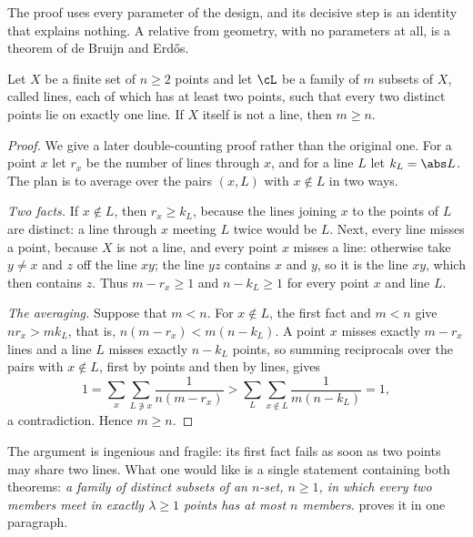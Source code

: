 \begin{refsection}
The proof uses every parameter of the design, and its decisive step is an identity that explains nothing. A relative from geometry, with no parameters at all, is a theorem of de Bruijn and Erd\H{o}s.

\begin{theorem}\label{thm:dimension:dbe}
Let $X$ be a finite set of $n\ge2$ points and let $\cL$ be a family of $m$ subsets of $X$, called lines, each of which has at least two points, such that every two distinct points lie on exactly one line. If $X$ itself is not a line, then $m\ge n$.
\end{theorem}

\begin{proof}
We give a later double-counting proof rather than the original one. For a point $x$ let $r_x$ be the number of lines through $x$, and for a line $L$ let $k_L=\abs L$. The plan is to average over the pairs $(x,L)$ with $x\notin L$ in two ways.

\emph{Two facts.} If $x\notin L$, then $r_x\ge k_L$, because the lines joining $x$ to the points of $L$ are distinct: a line through $x$ meeting $L$ twice would be $L$. Next, every line misses a point, because $X$ is not a line, and every point $x$ misses a line: otherwise take $y\ne x$ and $z$ off the line $xy$; the line $yz$ contains $x$ and $y$, so it is the line $xy$, which then contains $z$. Thus $m-r_x\ge1$ and $n-k_L\ge1$ for every point $x$ and line $L$.

\emph{The averaging.} Suppose that $m<n$. For $x\notin L$, the first fact and $m<n$ give $nr_x>mk_L$, that is, $n(m-r_x)<m(n-k_L)$. A point $x$ misses exactly $m-r_x$ lines and a line $L$ misses exactly $n-k_L$ points, so summing reciprocals over the pairs with $x\notin L$, first by points and then by lines, gives
\[
1=\sum_{x}\sum_{L\not\ni x}\frac{1}{n(m-r_x)}>\sum_{L}\sum_{x\notin L}\frac{1}{m(n-k_L)}=1,
\]
a contradiction. Hence $m\ge n$.
\end{proof}

The argument is ingenious and fragile: its first fact fails as soon as two points may share two lines. What one would like is a single statement containing both theorems: \emph{a family of distinct subsets of an $n$-set, $n\ge1$, in which every two members meet in exactly $\lambda\ge1$ points has at most $n$ members.}  proves it in one paragraph.


\end{refsection}
